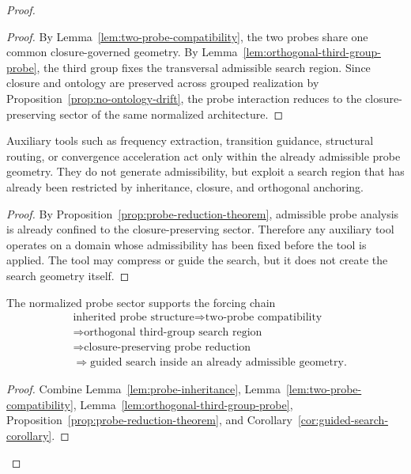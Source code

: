 \begin{proof}
\begin{proof}
By Lemma~\ref{lem:two-probe-compatibility}, the two probes share one common
closure-governed geometry. By Lemma~\ref{lem:orthogonal-third-group-probe}, the
third group fixes the transversal admissible search region. Since closure and
ontology are preserved across grouped realization by
Proposition~\ref{prop:no-ontology-drift}, the probe interaction reduces to the
closure-preserving sector of the same normalized architecture.
\end{proof}

\begin{corollary}
\label{cor:guided-search-corollary}
Auxiliary tools such as frequency extraction, transition guidance, structural
routing, or convergence acceleration act only within the already admissible
probe geometry. They do not generate admissibility, but exploit a search region
that has already been restricted by inheritance, closure, and orthogonal
anchoring.
\end{corollary}

\begin{proof}
By Proposition~\ref{prop:probe-reduction-theorem}, admissible probe analysis is
already confined to the closure-preserving sector. Therefore any auxiliary tool
operates on a domain whose admissibility has been fixed before the tool is
applied. The tool may compress or guide the search, but it does not create the
search geometry itself.
\end{proof}

\begin{corollary}
\label{cor:first-probe-forcing-chain}
The normalized probe sector supports the forcing chain
\[
\begin{aligned}
&\text{inherited probe structure}
  \Longrightarrow \text{two-probe compatibility}\\
&\Longrightarrow \text{orthogonal third-group search region}\\
&\Longrightarrow \text{closure-preserving probe reduction}\\
&\Longrightarrow \text{guided search inside an already admissible geometry}.
\end{aligned}
\]
\end{corollary}

\begin{proof}
Combine Lemma~\ref{lem:probe-inheritance},
Lemma~\ref{lem:two-probe-compatibility},
Lemma~\ref{lem:orthogonal-third-group-probe},
Proposition~\ref{prop:probe-reduction-theorem}, and
Corollary~\ref{cor:guided-search-corollary}.
\end{proof}




\end{proof}
